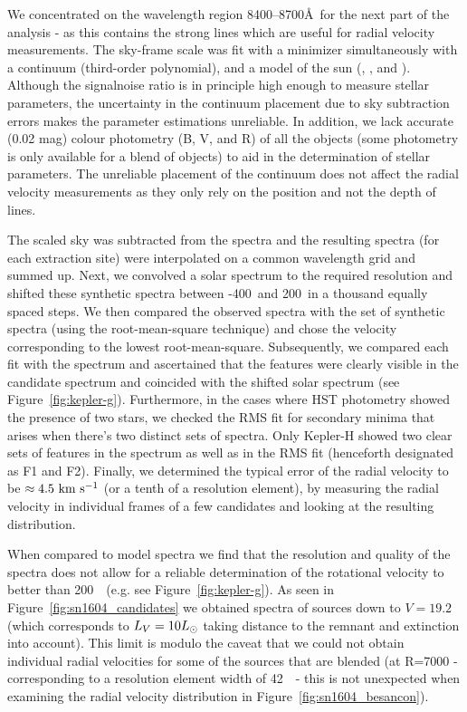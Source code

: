 \documentclass[preprint2]{aastex}
\begin{document}
We concentrated on the wavelength region 8400--8700\AA\ for the next part of the analysis - as this contains the strong  lines which are useful for radial velocity measurements. The sky-frame scale was fit with a minimizer \citep{powell1964efficient} simultaneously with a continuum (third-order polynomial), and a model of the sun (, , and ). Although the \gls{signalnoise} ratio is in principle high enough to measure stellar parameters, the uncertainty in the continuum placement due to sky
subtraction errors makes the parameter estimations unreliable. In addition, we lack accurate (0.02 mag) colour photometry (B, V, and R) of all the objects (some photometry is only available for a blend of objects) to aid in the determination of stellar parameters. The unreliable placement of the continuum does not affect the radial velocity measurements as they only rely on the position and not the depth of lines.

The scaled sky was subtracted from the spectra and the resulting spectra (for each extraction site) were interpolated on a common wavelength grid and summed up. Next, we convolved a solar spectrum to the required resolution and shifted these synthetic spectra between -400\kms\ and 200\kms\ in a thousand equally spaced steps. We then compared the observed spectra with the set of synthetic spectra (using the root-mean-square technique) and chose the velocity corresponding to the lowest root-mean-square. Subsequently, we compared each fit with the spectrum and ascertained that the  features were clearly visible in the candidate spectrum and coincided with the shifted solar spectrum (see Figure~\ref{fig:kepler-g}). Furthermore, in the cases where HST photometry showed the presence of two stars, we checked the RMS fit for secondary minima that arises when there's two distinct sets of spectra. Only Kepler-H showed two clear sets of  features in the spectrum as well as in the RMS fit (henceforth designated as F1 and F2). Finally, we determined the typical error of the radial velocity to be $\approx4.5~\textrm{km}~\textrm{s}^{-1}$  (or a tenth of a resolution element), by measuring the radial velocity in individual frames of a few candidates and looking at the resulting distribution. 

When compared to model spectra we find that the resolution and quality of the spectra does not allow for a reliable determination of the rotational velocity to better than 200~\kms\ (e.g. see Figure~\ref{fig:kepler-g}). As seen in Figure~\ref{fig:sn1604_candidates} we obtained spectra of sources down to $V = 19.2$ (which corresponds to $L_V = 10\hbox{$L_{\odot}$}$ taking distance to the remnant and extinction into account). This limit is modulo the caveat that we could not obtain individual radial velocities for some of the sources that are blended (at R=7000 - corresponding to a resolution element width of 42~\kms\ - this is not unexpected when examining the radial velocity distribution in Figure~\ref{fig:sn1604_besancon}).
\end{document}
